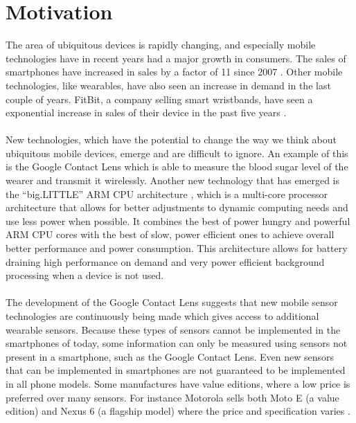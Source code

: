 
\section{Motivation}
\label{sec:motivation}

The area of ubiquitous devices is rapidly changing, and especially mobile technologies have in recent years had a major growth in consumers. The sales of smartphones have increased in sales by a factor of 11 since 2007 \parencite{statsia_smartphones}. Other mobile technologies, like wearables, have also seen an increase in demand in the last couple of years. FitBit, a company selling smart wristbands, have seen a exponential increase in sales of their device in the past five years \parencite{statsia_fitbit}.
\\\\
New technologies, which have the potential to change the way we think about ubiquitous mobile devices, emerge and are difficult to ignore. An example of this is the Google Contact Lens \parencite{google_contact_lens} which is able to measure the blood sugar level of the wearer and transmit it wirelessly. Another new technology that has emerged is the ``big.LITTLE'' ARM CPU architecture \parencite{big_little_architecture}, which is a multi-core processor architecture that allows for better adjustments to dynamic computing needs and use less power when possible. It combines the best of power hungry and powerful ARM CPU cores with the best of slow, power efficient ones to achieve overall better performance and power consumption. This architecture allows for battery draining high performance on demand and very power efficient background processing when a device is not used. 
\\\\
The development of the Google Contact Lens suggests that new mobile sensor technologies are continuously being made which gives access to additional wearable sensors. Because these types of sensors cannot be implemented in the smartphones of today, some information can only be measured using sensors not present in a smartphone, such as the Google Contact Lens. Even new sensors that can be implemented in smartphones are not guaranteed to be implemented in all phone models. Some manufactures have value editions, where a low price is preferred over many sensors. For instance Motorola sells both Moto E (a value edition) and Nexus 6 (a flagship model) where the price and specification varies \parencite{moto_e_compared_to_nexus_6}.
